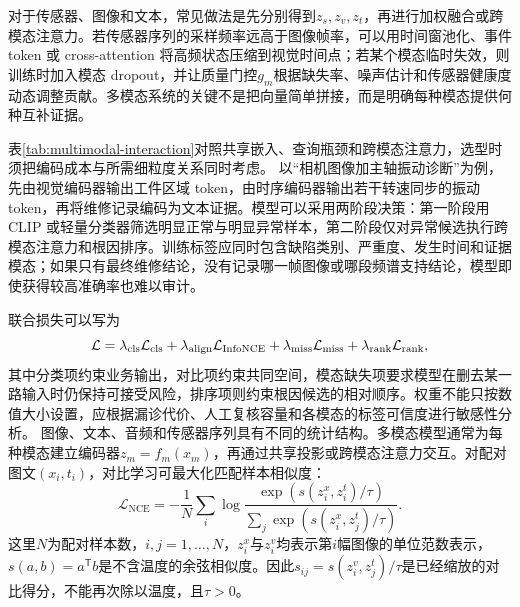 对于传感器、图像和文本，常见做法是先分别得到$z_s,z_v,z_t$，再进行加权融合或跨模态注意力。若传感器序列的采样频率远高于图像帧率，可以用时间窗池化、事件 token 或 cross-attention 将高频状态压缩到视觉时间点；若某个模态临时失效，则训练时加入模态 dropout，并让质量门控$g_m$根据缺失率、噪声估计和传感器健康度动态调整贡献。多模态系统的关键不是把向量简单拼接，而是明确每种模态提供何种互补证据。

\begin{table}[htbp]
\centering
\caption{多模态模型的交互位置与适用任务}
\label{tab:multimodal-interaction}
\scriptsize
\setlength{\tabcolsep}{3pt}
\end{table}

表\ref{tab:multimodal-interaction}对照共享嵌入、查询瓶颈和跨模态注意力，选型时须把编码成本与所需细粒度关系同时考虑。
以“相机图像加主轴振动诊断”为例，先由视觉编码器输出工件区域 token，由时序编码器输出若干转速同步的振动 token，再将维修记录编码为文本证据。模型可以采用两阶段决策：第一阶段用 CLIP 或轻量分类器筛选明显正常与明显异常样本，第二阶段仅对异常候选执行跨模态注意力和根因排序。训练标签应同时包含缺陷类别、严重度、发生时间和证据模态；如果只有最终维修结论，没有记录哪一帧图像或哪段频谱支持结论，模型即使获得较高准确率也难以审计。

联合损失可以写为
\begin{equation}
 \mathcal{L}=\lambda_{\rm cls}\mathcal{L}_{\rm cls}+\lambda_{\rm align}\mathcal{L}_{\rm InfoNCE}+\lambda_{\rm miss}\mathcal{L}_{\rm miss}+\lambda_{\rm rank}\mathcal{L}_{\rm rank},
\end{equation}
其中分类项约束业务输出，对比项约束共同空间，模态缺失项要求模型在删去某一路输入时仍保持可接受风险，排序项则约束根因候选的相对顺序。权重不能只按数值大小设置，应根据漏诊代价、人工复核容量和各模态的标签可信度进行敏感性分析。
图像、文本、音频和传感器序列具有不同的统计结构。多模态模型通常为每种模态建立编码器$z_m=f_m(x_m)$，再通过共享投影或跨模态注意力交互。对配对图文$(x_i,t_i)$，对比学习可最大化匹配样本相似度：
\begin{equation}
 \mathcal{L}_{\mathrm{NCE}}=-\frac{1}{N}\sum_i\log\frac{\exp(s(z_i^x,z_i^t)/\tau)}{\sum_j\exp(s(z_i^x,z_j^t)/\tau)}.
\end{equation}
这里$N$为配对样本数，$i,j=1,\ldots,N$，$z_i^x$与$z_i^v$均表示第$i$幅图像的单位范数表示，$s(a,b)=a^{\mathsf T}b$是不含温度的余弦相似度。因此$s_{ij}=s(z_i^v,z_j^t)/\tau$是已经缩放的对比得分，不能再次除以温度，且$\tau>0$。

